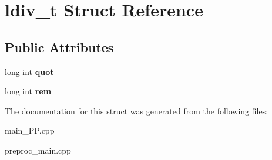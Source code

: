 \hypertarget{structldiv__t}{\section{ldiv\+\_\+t Struct Reference}
\label{structldiv__t}
}
\subsection*{Public Attributes}
\begin{DoxyCompactItemize}
\item 
\hypertarget{structldiv__t_ac56cf5939abb521a3a0c48f422b72271}{long int {\bfseries quot}}\label{structldiv__t_ac56cf5939abb521a3a0c48f422b72271}

\item 
\hypertarget{structldiv__t_a66737a893b8872671393a49aaf568cb1}{long int {\bfseries rem}}\label{structldiv__t_a66737a893b8872671393a49aaf568cb1}

\end{DoxyCompactItemize}


The documentation for this struct was generated from the following files\+:\begin{DoxyCompactItemize}
\item 
main\+\_\+\+P\+P.\+cpp\item 
preproc\+\_\+main.\+cpp\end{DoxyCompactItemize}
